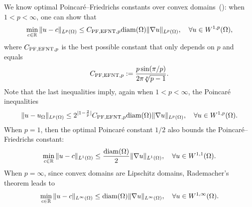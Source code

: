 \documentclass[10pt,letterpaper]{article}
\begin{document}
We know optimal Poincar\'e--Friedrichs constants over convex domains~(\cite[Theorem~1.1]{ferone2012remark}\cite[Theorem~1.1]{esposito2013poincare}): 
when $1 < p < \infty$, one can show that 
\begin{align}\label{math:esposito:pf}
    \min\limits_{ c \in {\mathbb R} }
    \| u - c \|_{L^{p}(\Omega)}
    \leq 
    C_{{\rm PF},{\rm EFNT},p}
    {\operatorname{diam}}(\Omega)
    \| \nabla u \|_{L^{p}(\Omega)}
    ,
    \quad 
    \forall 
    u \in W^{1,p}(\Omega)
    ,
\end{align}
where $C_{{\rm PF},{\rm EFNT},p}$ is the best possible constant that only depends on $p$ and equals 
\begin{align*}
    C_{{\rm PF},{\rm EFNT},p}
    :=
    \frac{ p \sin(\pi/p) }{ 2\pi \sqrt[p]{p-1} }
    .
\end{align*}
Note that the last inequalities imply, again when $1 < p < \infty$, the Poincar\'e inequalities
\begin{align}\label{math:esposito:poincare}
    \| u - u_{\Omega} \|_{L^{p}(\Omega)}
    \leq 
    2^{|1-\frac 2 p|}C_{{\rm PF},{\rm EFNT},p}
    {\operatorname{diam}}(\Omega)
    \| \nabla u \|_{L^{p}(\Omega)}
    ,
    \quad 
    \forall 
    u \in W^{1,p}(\Omega)
    .
\end{align}
When $p=1$, then the optimal Poincar\'e constant $1/2$ also bounds the Poincar\'e--Friedrichs constant:
\begin{align}\label{math:l1estimate}
    \min\limits_{ c \in {\mathbb R} }
    \| u - c \|_{L^{1}(\Omega)}
    \leq 
    \frac{ {\operatorname{diam}}(\Omega) }{2}
    \| \nabla u \|_{L^{1}(\Omega)}
    ,
    \quad 
    \forall 
    u \in W^{1,1}(\Omega)
    .
\end{align}
When $p=\infty$, since convex domains are Lipschitz domains, Rademacher's theorem leads to 
\begin{align}\label{math:lipschitzestimate}
    \min\limits_{ c \in {\mathbb R} }
    \| u - c \|_{L^{\infty}(\Omega)}
    \leq 
    {\operatorname{diam}}(\Omega)
    \| \nabla u \|_{L^{\infty}(\Omega)}
    ,
    \quad 
    \forall 
    u \in W^{1,\infty}(\Omega)
    .
\end{align}

\end{document}
